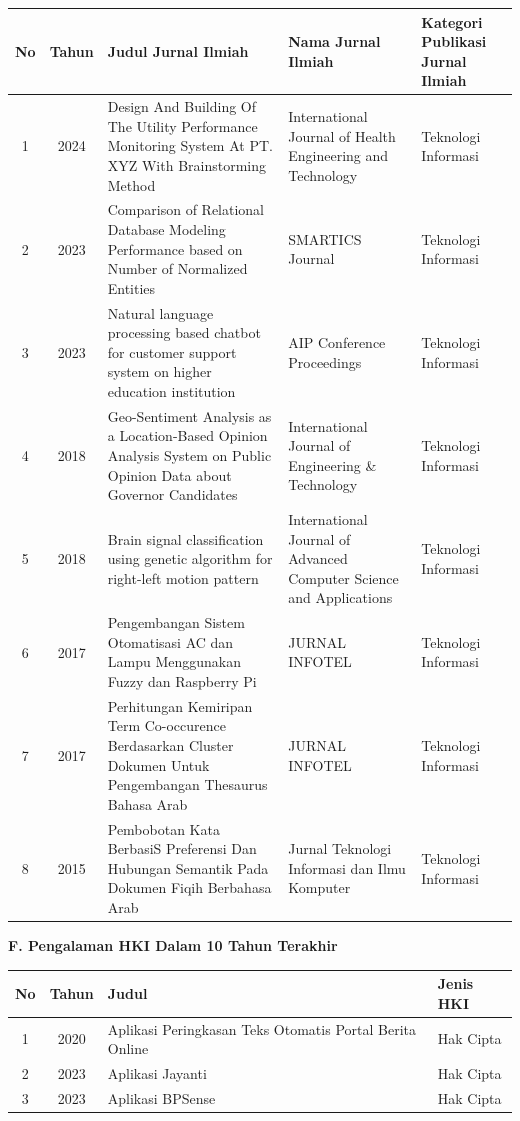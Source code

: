 {\footnotesize
\begin{longtable}{|c|c|p{6cm}|p{3.5cm}|p{2.5cm}|}
\hline
\textbf{No} & \textbf{Tahun} & \textbf{Judul Jurnal Ilmiah} & \textbf{Nama Jurnal Ilmiah} & \textbf{Kategori Publikasi Jurnal Ilmiah} \\
\hline
1 & 2024 & Design And Building Of The Utility Performance Monitoring System At PT. XYZ With Brainstorming Method & International Journal of Health Engineering and Technology & Teknologi Informasi \\
\hline
2 & 2023 & Comparison of Relational Database Modeling Performance based on Number of Normalized Entities & SMARTICS Journal & Teknologi Informasi \\
\hline
3 & 2023 & Natural language processing based chatbot for customer support system on higher education institution & AIP Conference Proceedings & Teknologi Informasi \\
\hline
4 & 2018 & Geo-Sentiment Analysis as a Location-Based Opinion Analysis System on Public Opinion Data about Governor Candidates & International Journal of Engineering \& Technology & Teknologi Informasi \\
\hline
5 & 2018 & Brain signal classification using genetic algorithm for right-left motion pattern & International Journal of Advanced Computer Science and Applications & Teknologi Informasi \\
\hline
6 & 2017 & Pengembangan Sistem Otomatisasi AC dan Lampu Menggunakan Fuzzy dan Raspberry Pi & JURNAL INFOTEL & Teknologi Informasi \\
\hline
7 & 2017 & Perhitungan Kemiripan Term Co-occurence Berdasarkan Cluster Dokumen Untuk Pengembangan Thesaurus Bahasa Arab & JURNAL INFOTEL & Teknologi Informasi \\
\hline
8 & 2015 & Pembobotan Kata BerbasiS Preferensi Dan Hubungan Semantik Pada Dokumen Fiqih Berbahasa Arab & Jurnal Teknologi Informasi dan Ilmu Komputer & Teknologi Informasi \\
\hline
\end{longtable}
}

\textbf{F. Pengalaman HKI Dalam 10 Tahun Terakhir}

{\footnotesize
\begin{longtable}{|c|c|p{8cm}|p{3cm}|}
\hline
\textbf{No} & \textbf{Tahun} & \textbf{Judul} & \textbf{Jenis HKI} \\
\hline
1 & 2020 & Aplikasi Peringkasan Teks Otomatis Portal Berita Online & Hak Cipta \\
\hline
2 & 2023 & Aplikasi Jayanti & Hak Cipta \\
\hline
3 & 2023 & Aplikasi BPSense & Hak Cipta \\
\hline
\end{longtable}
}

